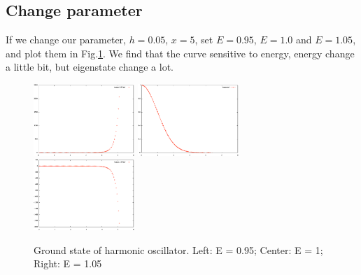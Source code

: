 \documentclass{article}
\begin{document}
\subsection{Change parameter}
If we change our parameter, $h=0.05$, $x = 5$, set $E = 0.95$, $E = 1.0$ and $E = 1.05$, and plot them in Fig.\ref{echange}. We find that the curve sensitive to energy, energy change a little bit, but eigenstate change a lot.
\begin{figure}
    \centering
    \includegraphics[width=1.5in]{e0.eps}
    \includegraphics[width=1.5in]{ground_num.eps}
    \includegraphics[width=1.5in]{e1.eps}
    \caption{Ground state of harmonic oscillator. Left: E = 0.95; Center: E = 1; Right:  E = 1.05}
    \label{echange}
\end{figure}
\end{document}
